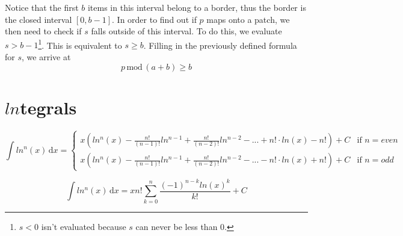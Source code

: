 \documentclass{article}
\newcommand{\dif}[1]{\,\mathrm{d}#1}
\newcommand{\intervaloo}[2]{\left[#1, #2\right]}
\newcommand{\Mod}{\,\mathrm{mod}\,}
\begin{document}
Notice that the first $b$ items in this interval belong to a border, thus the border is the closed interval $\intervaloo{0}{b-1}$. In order to find out if $p$ maps onto a patch, we then need to check if $s$ falls outside of this interval. 
To do this, we evaluate $s> b-1$\footnote[2]{$s < 0$ isn't evaluated because $s$ can never be less than 0.}.
This is equivalent to $s\geq b$.
Filling in the previously defined formula for $s$, we arrive at $$p\Mod(a + b) \geq b$$

\section{$ln$tegrals}
$$\int ln^n(x)\dif{x}=
\begin{cases}
x(ln^n(x)-\frac{n!}{(n-1)!}ln^{n-1}+\frac{n!}{(n-2)!}ln^{n-2}-...+n!\cdot ln(x)-n!)+C & \text{if } n=even \\ 
x(ln^n(x)-\frac{n!}{(n-1)!}ln^{n-1}+\frac{n!}{(n-2)!}ln^{n-2}-...-n!\cdot ln(x)+n!)+C & \text{if } n=odd
\end{cases}$$

$$\int ln^n(x)\dif{x}=xn!\sum_{k=0}^{n}\frac{(-1)^{n-k}ln(x)^k}{k!}+C$$
\end{document}

